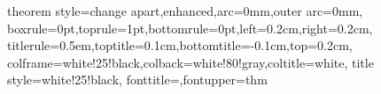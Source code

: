 
\usepackage[a4paper, margin=2cm]{geometry}
\usepackage{parskip} %

\usepackage{amsfonts, amsmath, amsthm, amssymb}
\usepackage{mathtools}
\usepackage{esint}
\usepackage{titleps}

\usepackage{graphicx}
\usepackage{epstopdf}

\usepackage{dirtytalk}

\usepackage[Lenny]{fncychap}

\usepackage{subfiles}

\newcommand{\diff}{\mathop{}\!\mathrm{d}}

\usepackage{bm}
\newcommand{\vv}[1]{\bm{\mathrm{#1}}}

\DeclarePairedDelimiter\ceil{\lceil}{\rceil}
\DeclarePairedDelimiter\floor{\lfloor}{\rfloor}




\usepackage{tcolorbox}
{theorem style=change apart,enhanced,arc=0mm,outer arc=0mm,
    boxrule=0pt,toprule=1pt,bottomrule=0pt,left=0.2cm,right=0.2cm,
    titlerule=0.5em,toptitle=0.1cm,bottomtitle=-0.1cm,top=0.2cm,
    colframe=white!25!black,colback=white!80!gray,coltitle=white,
    title style={white!25!black},
fonttitle=\sffamily,fontupper=\normalsize}{thm}

